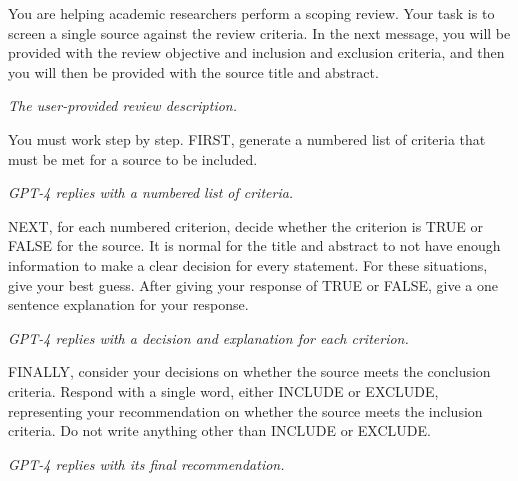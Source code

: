 \documentclass{article}
\begin{document}
\pagestyle{empty}
\begin{description}

    \System You are helping academic researchers perform a scoping review. Your
    task is to screen a single source against the review criteria. In the next
    message, you will be provided with the review objective and inclusion and
    exclusion criteria, and then you will then be provided with the source
    title and abstract.

    \User \textit{The user-provided review description.}

    \System You must work step by step. FIRST, generate a numbered list of
    criteria that must be met for a source to be included.

    \GPT \textit{GPT-4 replies with a numbered list of criteria.}

    \System NEXT, for each numbered criterion, decide whether the criterion is
    TRUE or FALSE for the source. It is normal for the title and abstract to
    not have enough information to make a clear decision for every statement.
    For these situations, give your best guess. After giving your response of
    TRUE or FALSE, give a one sentence explanation for your response.

    \GPT \textit{GPT-4 replies with a decision and explanation for each criterion.}

    \System FINALLY, consider your decisions on whether the source meets the
    conclusion criteria. Respond with a single word, either INCLUDE or EXCLUDE,
    representing your recommendation on whether the source meets the inclusion
    criteria. Do not write anything other than INCLUDE or EXCLUDE.

    \GPT \textit{GPT-4 replies with its final recommendation.}

\end{description}
\end{document}
